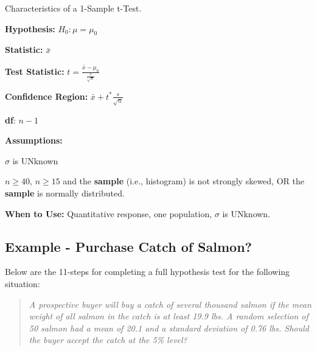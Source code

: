 \documentclass[10pt,openany]{book}\usepackage[]{graphicx}\usepackage[]{color}
\begin{document}
\begin{table}[h]
\centering
\colorbox{ltgray}{
\begin{minipage}{.75\textwidth}
  \centering
	\caption{Characteristics of a 1-Sample t-Test.}\label{tab:1tspec}
  \begin{Itemize}
    \vspace*{-6pt}
      \item \textbf{Hypothesis:} $H_{0}:\mu=\mu_{0}$
      \item \textbf{Statistic:} $\bar{x}$
      \vspace{4pt}
      \item \textbf{Test Statistic:} $t=\frac{\bar{x}-\mu_{0}}{\frac{s}{\sqrt{n}}}$
      \vspace{4pt}
      \item \textbf{Confidence Region:} $\bar{x}+t^{*}\frac{s}{\sqrt{n}}$
      \item \textbf{df}: $n-1$
      \item \textbf{Assumptions:}
        \begin{Enumerate}
          \item $\sigma$ is UNknown
          \item $n\geq40$, $n\geq15$ and the \textbf{sample} (i.e., histogram) is not strongly skewed, OR the \textbf{sample} is normally distributed.
        \end{Enumerate}
      \item \textbf{When to Use:} Quantitative response, one population, $\sigma$ is UNknown.
  \end{Itemize}
\end{minipage}}
\end{table}

\subsection{Example - Purchase Catch of Salmon?}
\vspace*{-2pt}
Below are the 11-steps  for completing a full hypothesis test for the following situation:
\vspace*{-14pt}
\begin{quote}
\textsl{A prospective buyer will buy a catch of several thousand salmon if the mean weight of all salmon in the catch is at least 19.9 lbs. A random selection of 50 salmon had a mean of 20.1 and a standard deviation of 0.76 lbs. Should the buyer accept the catch at the 5\% level?}
\end{quote}
\vspace*{-12pt}
\end{document}
